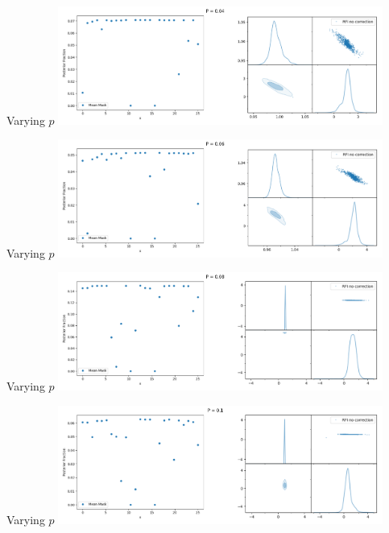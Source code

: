\documentclass[aspectratio=169]{beamer}
\begin{document}
\begin{frame}{Varying $p$}
    \centering
    \includegraphics[width=0.8\textwidth]{images/gif_anest/comb_3.png}
\end{frame}


\begin{frame}{Varying $p$}
    \centering
    \includegraphics[width=0.8\textwidth]{images/gif_anest/comb_4.png}
\end{frame}

\begin{frame}{Varying $p$}
    \centering
    \includegraphics[width=0.8\textwidth]{images/gif_anest/comb_5.png}
\end{frame}

\begin{frame}{Varying $p$}
    \centering
    \includegraphics[width=0.8\textwidth]{images/gif_anest/comb_6.png}
\end{frame}
\end{document}
